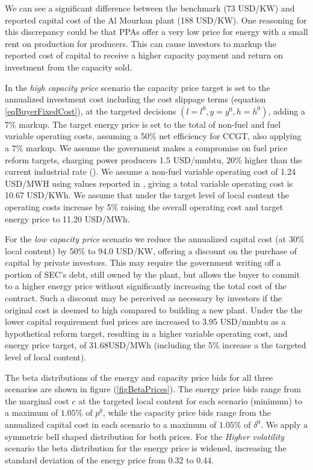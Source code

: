 \documentclass[informs]{informs3}
\begin{document}
We can see a significant difference between the benchmark (73 USD/KW) and reported capital cost of the Al Mourkan plant (188 USD/KW). One reasoning for this discrepancy could be that PPAs offer a very low price for energy with a small rent on production for producers. This can cause investors to markup the reported cost of capital to receive a higher capacity payment and return on investment from the capacity sold. 

 In the \textit{high capacity price} scenario the capacity price target is set to the annualized investment cost including the cost slippage terms (equation \ref{eqBuyerFixedCost}), at the targeted decisions $(l=l^{0}, y=y^{0}, h=h^{0})$,  adding a $7\%$ markup. The target energy price is set to the total of non-fuel and fuel variable operating costs, assuming a 50\% net efficiency for CCGT, also applying a $7\%$ markup.  We assume the government makes a compromise on fuel price reform targets, charging power producers 1.5 USD/mmbtu, $20\%$ higher than the current industrial rate (\citealp{Fattouh_2018}). We assume a non-fuel variable operating cost of 1.24 USD/MWH using values reported in \cite{Rioux_et_al_2017}, giving a total variable operating cost is 10.67 USD/KWh. We assume that under the target level of local content the operating costs increase by 5\% raising the overall operating cost and target energy price to 11.20 USD/MWh.

For the \textit{low capacity price} scenario we reduce the annualized capital cost (at 30\% local content) by 50\% to 94.0 USD/KW, offering a discount on the purchase of capital by private investors. This may require the government writing off a portion of SEC’s debt, still owned by the plant, but allows the buyer to commit to a higher energy price without significantly increasing the total cost of the contract.  Such a discount may be perceived as necessary by investors if the original cost is deemed to high compared to building a new plant. Under the the lower capital requirement fuel prices are increased to 3.95 USD/mmbtu as a hypothetical reform target, resulting in a higher variable operating cost, and energy price target, of  31.68USD/MWh (including the 5\% increase a the targeted level of local content).


The beta distributions of the energy and capacity price bids for all three scenarios are shown in figure (\ref{figBetaPrices}). The energy price bids range from the marginal cost $c$ at the targeted local content for each scenario (minimum) to a maximum of $1.05\%$ of $p^0$, while the capacity price bids range from the annualized capital cost in each scenario to a maximum of $1.05\%$ of $\delta^0$. We apply a symmetric bell shaped distribution for both prices. For the \textit{Higher volatility} scenario the beta distribution for the energy price is widened, increasing the standard deviation of the energy price from 0.32 to 0.44.
\end{document}
